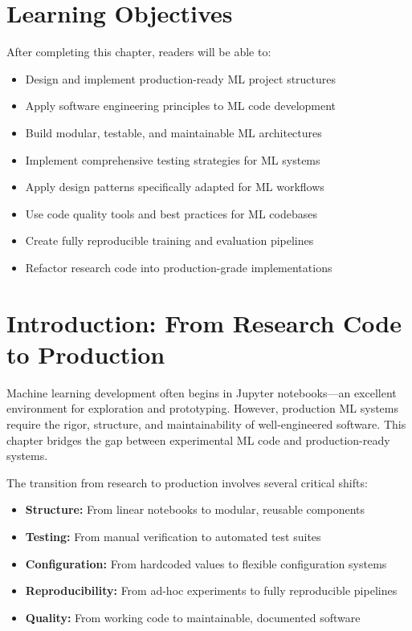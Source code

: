 \section{Learning Objectives}

After completing this chapter, readers will be able to:
\begin{itemize}
    \item Design and implement production-ready ML project structures
    \item Apply software engineering principles to ML code development
    \item Build modular, testable, and maintainable ML architectures
    \item Implement comprehensive testing strategies for ML systems
    \item Apply design patterns specifically adapted for ML workflows
    \item Use code quality tools and best practices for ML codebases
    \item Create fully reproducible training and evaluation pipelines
    \item Refactor research code into production-grade implementations
\end{itemize}

\section{Introduction: From Research Code to Production}

Machine learning development often begins in Jupyter notebooks—an excellent environment for exploration and prototyping. However, production ML systems require the rigor, structure, and maintainability of well-engineered software. This chapter bridges the gap between experimental ML code and production-ready systems.

The transition from research to production involves several critical shifts:

\begin{itemize}
    \item \textbf{Structure:} From linear notebooks to modular, reusable components
    \item \textbf{Testing:} From manual verification to automated test suites
    \item \textbf{Configuration:} From hardcoded values to flexible configuration systems
    \item \textbf{Reproducibility:} From ad-hoc experiments to fully reproducible pipelines
    \item \textbf{Quality:} From working code to maintainable, documented software
\end{itemize}

